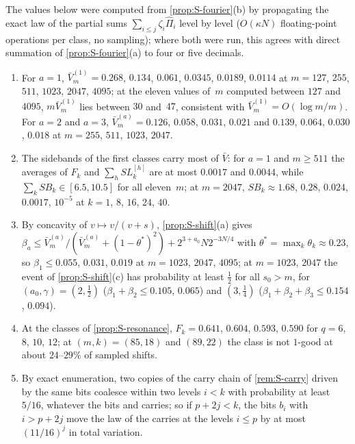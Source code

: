 \begin{remark}\label{rem:S-numerics}
The values below were computed from \cref{prop:S-fourier}(b) by propagating the exact law of the partial sums
$\sum_{i\le j}\zeta_i\hat\Pi_i$ level by level ($O(\kappa N)$ floating-point operations per class, no sampling); where
both were run, this agrees with direct summation of \cref{prop:S-fourier}(a) to four or five decimals.
\begin{enumerate}[label=(\arabic*)]
\item For $a=1$, $\bar V^{(1)}_m=0.268$, $0.134$, $0.061$, $0.0345$, $0.0189$, $0.0114$ at $m=127$, $255$, $511$, $1023$,
  $2047$, $4095$; at the eleven values of~$m$ computed between $127$ and $4095$, $m\bar V^{(1)}_m$ lies between $30$
  and~$47$, consistent with $\bar V^{(1)}_m=O(\log m/m)$. For $a=2$ and $a=3$, $\bar V^{(a)}_m=0.126$, $0.058$, $0.031$,
  $0.021$ and $0.139$, $0.064$, $0.030$, $0.018$ at $m=255$, $511$, $1023$, $2047$.
\item The sidebands of the first classes carry most of $\bar V$: for $a=1$ and $m\ge511$ the averages of $F_k$ and
  $\sum_hSL^{[h]}_k$ are at most $0.0017$ and $0.0044$, while $\sum_kSB_k\in[6.5,10.5]$ for all eleven~$m$; at $m=2047$,
  $SB_k\approx1.68$, $0.28$, $0.024$, $0.0017$, $10^{-5}$ at $k=1$, $8$, $16$, $24$, $40$.
\item By concavity of $v\mapsto v/(v+s)$, \cref{prop:S-shift}(a) gives
  $\beta_a\le\bar V^{(a)}_m/(\bar V^{(a)}_m+(1-\theta^*)^2)+2^{3+a_0}N2^{-3N/4}$ with $\theta^*=\max_k\theta_k\approx0.23$, so
  $\beta_1\le0.055$, $0.031$, $0.019$ at $m=1023$, $2047$, $4095$; at $m=1023$, $2047$ the event of \cref{prop:S-shift}(c)
  has probability at least $\frac12$ for all $s_0>m$, for $(a_0,\gamma)=(2,\frac12)$ ($\beta_1+\beta_2\le0.105$, $0.065$)
  and $(3,\frac14)$ ($\beta_1+\beta_2+\beta_3\le0.154$, $0.094$).
\item At the classes of \cref{prop:S-resonance}, $F_k=0.641$, $0.604$, $0.593$, $0.590$ for $q=6$, $8$, $10$, $12$; at
  $(m,k)=(85,18)$ and $(89,22)$ the class is not $1$-good at about $24$--$29\%$ of sampled shifts.
\item By exact enumeration, two copies of the carry chain of \cref{rem:S-carry} driven by the same bits coalesce within
  two levels $i<k$ with probability at least $5/16$, whatever the bits and carries; so if $p+2j<k$, the bits $b_i$ with
  $i>p+2j$ move the law of the carries at the levels $i\le p$ by at most $(11/16)^j$ in total variation.
\end{enumerate}
\end{remark}
